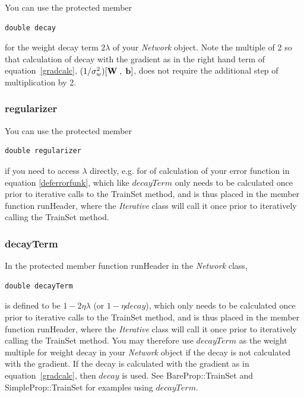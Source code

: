 \documentclass{report}
\begin{document}
You can use the protected member

\begin{verbatim}
double decay
\end{verbatim}

for the weight decay term $2\lambda$ of your {\em Network} object.
Note the multiple of 2 so that calculation of decay with the gradient
as in the right hand term of equation~\ref{gradcalc},
$(1/\sigma_w^2)[{\bf W} \;,\; {\bf b}]$, does not require the
additional step of multiplication by 2.

\subsubsection{regularizer}

You can use the protected member

\begin{verbatim}
double regularizer
\end{verbatim}

if you need to access $\lambda$ directly, e.g. for of calculation of
your error function in equation \ref{deferrorfunk}, which like
$decayTerm$ only needs to be calculated once prior to iterative calls
to the TrainSet method, and is thus placed in the member function
runHeader, where the {\em Iterative} class will call it once prior to
iteratively calling the TrainSet method.

\subsubsection{decayTerm}\label{decayTermSect}

In the protected member function runHeader in the {\em Network} class,

\begin{verbatim}
double decayTerm
\end{verbatim}

is defined to be $1-2\eta\lambda$ (or $1-\eta decay$), which only
needs to be calculated once prior to iterative calls to the TrainSet
method, and is thus placed in the member function runHeader, where the
{\em Iterative} class will call it once prior to iteratively calling
the TrainSet method.  You may therefore use $decayTerm$ as the weight
multiple for weight decay in your {\em Network} object if the decay is
not calculated with the gradient.  If the decay is calculated with the
gradient as in equation~\ref{gradcalc}, then $decay$ is used.  See
BareProp::TrainSet and SimpleProp::TrainSet for examples using
$decayTerm$.
\end{document}
